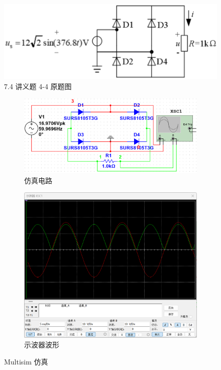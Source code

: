 \documentclass[UTF8]{report}
\theoremstyle{MyLineTheoremStyle} %
\theoremstyle{MyBlockTheoremStyle} %
\theoremstyle{MySubsubsectionStyle} %
\begin{document}
\begin{figure}[H]\centering
\includegraphics[width=0.6\columnwidth]{assets/7/f58e2946a0f20190cc27e51dfb8abb5a.png}
\caption{7.4 讲义题 4-4 原题图}\label{}
\end{figure}
\begin{figure}[H]\centering
\begin{subfigure}[b]{\columnwidth}\centering
    \includegraphics[width=\columnwidth]{assets/7/e6767042d587b4f2ea07f547a007dc1f.png}
    \caption{仿真电路}
\end{subfigure}\hfill
\begin{subfigure}[b]{\columnwidth}\centering
    \includegraphics[width=\columnwidth]{assets/7/d6a5ae36fb1ce8222b2554fb80254b4a.png}
    \caption{示波器波形}
\end{subfigure}
\caption{Multisim 仿真}
\label{Multisim 仿真}
\end{figure}
\end{document}

